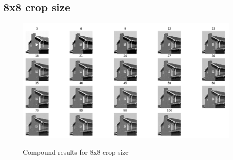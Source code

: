 \documentclass[../IDP_Task5_Karwowski_Kowalewski.tex]{subfiles}
\begin{document}
{    \subsection{8x8 crop size} \label{kowalewski_results_8x8} {

        \begin{figure}[!htbp]
            \centering
            \includegraphics[width=1.2\textwidth]{img/kowalewski/compound_8.png}
            \label{fig:compound_8}
            \caption{Compound results for 8x8 crop size}
        \end{figure}


}}
\end{document}
